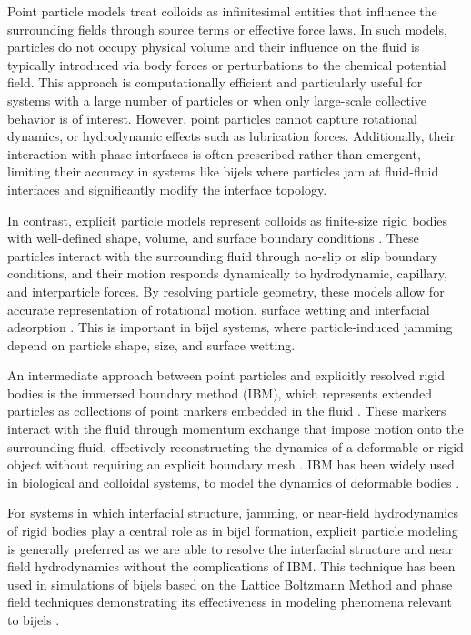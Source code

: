 Point particle models treat colloids as infinitesimal entities that influence the surrounding fields through source terms or effective force laws. 
\cite{mehrabadi_direct_2018, prosperetti_point-particle_2007, frohlich_validation_2018}
In such models, particles do not occupy physical volume and their influence on the fluid is typically introduced via body forces or perturbations to the chemical potential field. 
This approach is computationally efficient and particularly useful for systems with a large number of particles or when only large-scale collective behavior is of interest. 
However, point particles cannot capture rotational dynamics, or hydrodynamic effects such as lubrication forces. Additionally, 
their interaction with phase interfaces is often prescribed rather than emergent, limiting their accuracy in systems like bijels where particles jam at fluid-fluid interfaces 
and significantly modify the interface topology.

In contrast, explicit particle models represent colloids as finite-size rigid bodies with well-defined shape, volume, and surface boundary conditions
\cite{ladd_numerical_1994, jansen_bijels_2011,gunther_timescales_2014}. These particles interact 
with the surrounding fluid through no-slip or slip boundary conditions, and their motion responds dynamically to hydrodynamic, capillary, and interparticle forces. By resolving 
particle geometry, these models allow for accurate representation of rotational motion, surface wetting and interfacial adsorption
\cite{jansen_bijels_2011, gunther_lattice_2013}.
This is important in bijel systems, where particle-induced jamming depend on particle shape, size, and surface wetting. 

An intermediate approach between point particles and explicitly resolved rigid bodies is the immersed boundary method (IBM), which represents extended particles as collections of 
point markers embedded in the fluid \cite{peskin_immersed_2002, luo_immersed-boundary_2008, spandan_parallel_2017}.
These markers interact with the fluid through momentum exchange that impose motion onto the surrounding fluid, effectively reconstructing 
the dynamics of a deformable or rigid object without requiring an explicit boundary mesh \cite{peskin_immersed_2002, luo_immersed-boundary_2008, spandan_parallel_2017}.
IBM has been widely used in biological and colloidal systems, to model the dynamics of deformable bodies \cite{peskin_immersed_2002, luo_immersed-boundary_2008, spandan_parallel_2017}.

For systems in which interfacial structure, jamming, or near-field hydrodynamics of rigid bodies play a central role as in bijel formation, explicit particle modeling 
is generally preferred as we are able to resolve the interfacial structure and near field hydrodynamics without the complications of IBM. This technique has been used in simulations of
bijels based on the Lattice Boltzmann Method and phase field techniques demonstrating its effectiveness in modeling
phenomena relevant to bijels \cite{jansen_bijels_2011,gunther_timescales_2014,carmack_tuning_2018}.

